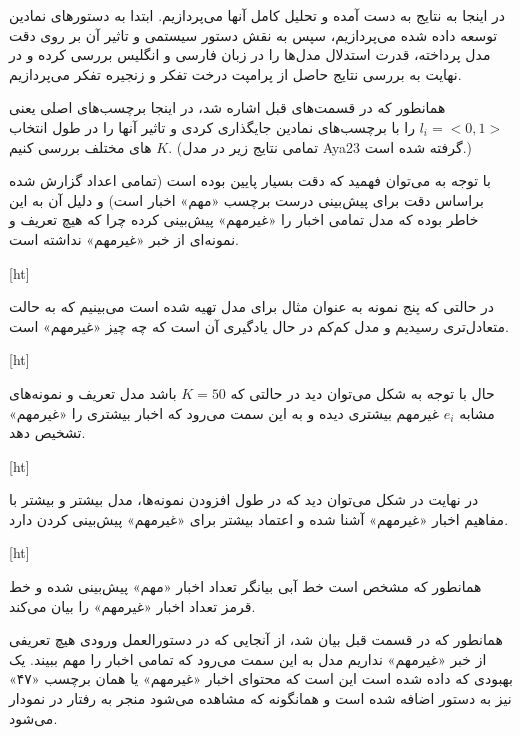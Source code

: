 در اینجا به نتایج به دست آمده و تحلیل کامل آنها می‌پردازیم. ابتدا به دستورهای نمادین توسعه داده شده می‌پردازیم، سپس به نقش دستور سیستمی و تاثیر آن بر روی دقت مدل پرداخته، قدرت استدلال مدل‌ها را در زبان فارسی و انگلیس بررسی کرده و در نهایت به بررسی نتایج حاصل از پرامپت درخت تفکر و زنجیره تفکر می‌پردازیم.


همانطور که در قسمت‌های قبل اشاره شد، در اینجا برچسب‌های اصلی یعنی
$l_i = <0,1>$
را با برچسب‌های نمادین جایگذاری کردی و تاثیر آنها را در طول انتخاب 
$K$
های مختلف بررسی کنیم. (تمامی نتایج زیر در مدل Aya23 گرفته شده است.)

با توجه به  می‌توان فهمید که دقت بسیار پایین بوده است (تمامی اعداد گزارش شده براساس دقت برای پیش‌بینی درست برچسب «مهم» اخبار است) و دلیل آن به این خاطر بوده که مدل تمامی اخبار را «غیرمهم» پیش‌بینی کرده چرا که هیچ تعریف و نمونه‌ای از خبر «غیرمهم» نداشته است.

[ht]

در حالتی که پنج نمونه به عنوان مثال برای مدل تهیه شده است می‌بینیم که به حالت متعادل‌تری رسیدیم و مدل کم‌کم در حال یادگیری آن است که چه چیز «غیرمهم» است.

[ht]

حال با توجه به شکل  می‌توان دید در حالتی که
$K = 50$
باشد مدل تعریف و نمونه‌های مشابه
$e_i$
غیرمهم بیشتری دیده و به این سمت‌ می‌رود که اخبار بیشتری را «غیرمهم» تشخیص دهد.


[ht]

در نهایت در شکل  می‌توان دید که در طول افزودن نمونه‌ها، مدل بیشتر و بیشتر با مفاهیم اخبار «غیرمهم» آشنا شده و اعتماد بیشتر برای «غیرمهم» پیش‌بینی کردن دارد.

[ht]

همانطور که مشخص است خط آبی بیانگر تعداد اخبار «مهم» پیش‌بینی شده و خط قرمز تعداد اخبار «غیرمهم» را بیان می‌کند.

همانطور که در قسمت قبل بیان شد، از آنجایی که در دستورالعمل ورودی هیچ تعریفی از خبر «غیرمهم» نداریم مدل به این سمت می‌رود که تمامی اخبار را مهم ببیند. یک بهبودی که داده‌ شده است این است که محتوای اخبار «غیرمهم» یا همان برچسب «۴۷» نیز به دستور اضافه شده است و همانگونه که مشاهده می‌شود منجر به رفتار در نمودار  می‌شود.


